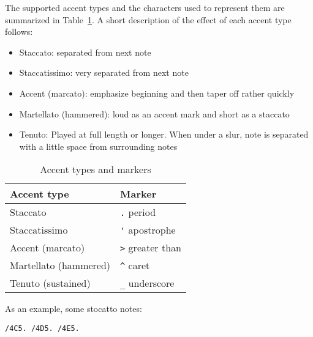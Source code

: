 \documentclass{scrartcl}
\begin{document}
The supported accent types and the characters used to represent them are summarized in Table~\ref{tab:accent_characters}. A short description of the effect of each accent type follows:
\begin{itemize}
	\item Staccato: separated from next note
	\item Staccatissimo: very separated from next note
	\item Accent (marcato): emphasize beginning and then taper off rather quickly
	\item Martellato (hammered): loud as an accent mark and short as a staccato
	\item Tenuto: Played at full length or longer. When under a slur, note is separated with a little space from surrounding notes
\end{itemize}

\begin{table}[ht]
\begin{center}
  \begin{tabular}{ l | l }
    \hline
    \textbf{Accent type} & \textbf{Marker} \\ \hline
    Staccato & \verb|.| \hspace{.1cm} period \\ \hline
    Staccatissimo & \verb|'| \hspace{.1cm} apostrophe \\ \hline
    Accent (marcato) & \verb|>| \hspace{.1cm} greater than \\ \hline
    Martellato (hammered) & \verb|^| \hspace{.1cm} caret \\ \hline
    Tenuto (sustained) & \verb|_| \hspace{.1cm} underscore \\ \hline
    \hline
  \end{tabular}
\end{center}
\caption{Accent types and markers}
\label{tab:accent_characters}
\end{table}

As an example, some stocatto notes:
\begin{center}
\verb|/4C5. /4D5. /4E5.|
\end{center}
\end{document}
